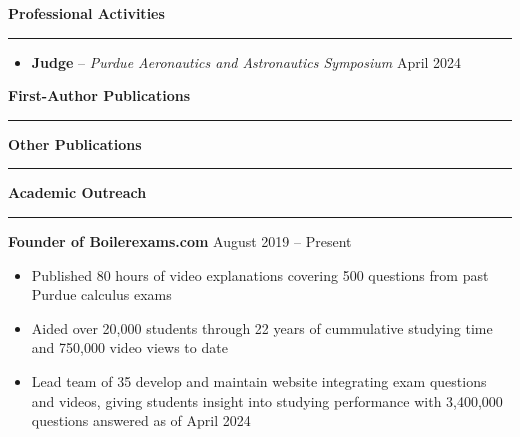 \documentclass[11pt, a4paper]{article}
\newcommand{\sectiontitle}[1]{{\Large \textbf{#1}}\vspace{0.5em}\hrule\vspace{0.5em}}
\begin{document}
\sectiontitle{Professional Activities}
\begin{itemize}[noitemsep]
    \item \textbf{Judge} -- \textit{Purdue Aeronautics and Astronautics Symposium} \hfill April 2024
\end{itemize}

\nocite{*}
\sectiontitle{First-Author Publications}
\printbibliography[heading=none, notkeyword={nobib}, resetnumbers=true]

\sectiontitle{Other Publications}
\printbibliography[heading=none, keyword={nobib}, resetnumbers=true]

\pagebreak
\sectiontitle{Academic Outreach}
\textbf{Founder of Boilerexams.com} \hfill August 2019 -- Present
\begin{itemize}[noitemsep]
    \item Published 80 hours of video explanations covering 500 questions from past Purdue calculus exams
    \item Aided over 20,000 students through 22 years of cummulative studying time and 750,000 video views to date
    \item Lead team of 35 develop and maintain website integrating exam questions and videos, giving students
    insight into studying performance with 3,400,000 questions answered as of April 2024
\end{itemize}
\end{document}
